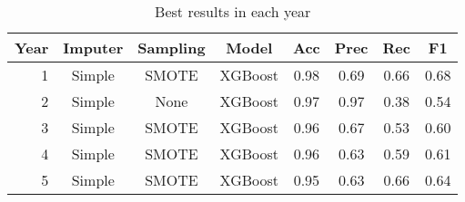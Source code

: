 \begin{table*}[htbp]
\centering
\begin{tabular}[htbp]{r|cc|c|cccc}
     \textbf{Year} & \textbf{Imputer} & \textbf{Sampling} &\textbf{Model} & \textbf{Acc} & \textbf{Prec} & \textbf{Rec} &\textbf{F1}  \\
     \hline
     1 & Simple & SMOTE & XGBoost & 0.98 & 0.69 & 0.66 & 0.68 \\
     2 & Simple & None & XGBoost & 0.97 & 0.97 & 0.38 & 0.54 \\
     3 & Simple & SMOTE & XGBoost & 0.96 & 0.67 & 0.53 & 0.60 \\
     4 & Simple & SMOTE & XGBoost & 0.96 & 0.63 & 0.59 & 0.61 \\
     5 & Simple & SMOTE & XGBoost & 0.95 & 0.63 & 0.66 & 0.64 \\
\end{tabular}
\caption{\label{tab::best_results} Best results in each year}
\end{table*}


